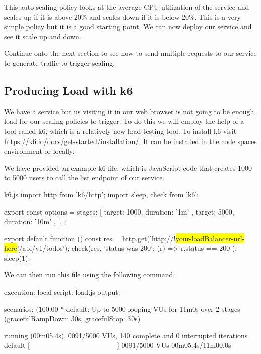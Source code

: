 \documentclass{csse4400}
\begin{document}
This auto scaling policy looks at the average CPU utilization of the service and scales up if it is above 20\% and scales down if it is below 20\%.
This is a very simple policy but it is a good starting point.
We can now deploy our service and see it scale up and down.

Continue onto the next section to see how to send multiple requests to our service to generate traffic to trigger scaling.

\subsection{Producing Load with k6}\label{k6}

We have a service but us visiting it in our web browser is not going to be enough load for our scaling policies to trigger.
To do this we will employ the help of a tool called k6,
which is a relatively new load testing tool.
To install k6 visit \url{https://k6.io/docs/get-started/installation/}.
It can be installed in the code spaces environment or locally.

We have provided an example k6 file, which is JavaScript code that creates
1000 to 5000 users to call the list endpoint of our service.

\begin{code}[language=javascript,numbers=none,escapechar=!]{k6.js}
import http from 'k6/http';
import { sleep, check } from 'k6';

export const options = {
  stages: [
    { target: 1000, duration: '1m' },
    { target: 5000, duration: '10m' },
  ],
};

export default function () {
  const res = http.get('http://!\colorbox{yellow}{your-loadBalancer-url-here}!/api/v1/todos');
  check(res, { 'status was 200': (r) => r.status == 200 });
  sleep(1);
}
\end{code}

We can then run this file using the following command.


\begin{code}[language=bash,numbers=none,keepspaces=true]{}
execution: local
  script: load.js
  output: -

scenarios: (100.00%
        * default: Up to 5000 looping VUs for 11m0s over 2 stages (gracefulRampDown: 30s, gracefulStop: 30s)


running (00m05.4s), 0091/5000 VUs, 140 complete and 0 interrupted iterations
default   [--------------------------------------] 0091/5000 VUs  00m05.4s/11m00.0s

\end{code}
\end{document}
